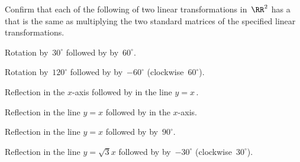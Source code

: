 \begin{exercise}  
Confirm that each of the following  of two linear transformations in~\(\RR^2\) has a  that is the same as multiplying the two standard matrices of the specified linear transformations.

\begin{Parts}
\item Rotation by~\(30^\circ\) followed by  by~\(60^\circ\).

\item Rotation by~\(120^\circ\) followed by  by~\(-60^\circ\) (clockwise~\(60^\circ\)).

\item Reflection in the \(x\)-axis followed by  in the line \(y=x\)\,.

\item Reflection in the line \(y=x\) followed by  in the \(x\)-axis.

\item Reflection in the line \(y=x\) followed by  by~\(90^\circ\).

\item Reflection in the line \(y=\sqrt3x\) followed by  by~\(-30^\circ\) (clockwise~\(30^\circ\)).

\end{Parts}
\end{exercise}




